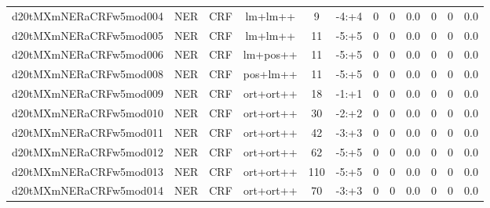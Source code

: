 \documentclass[a4paper]{article}
\begin{document}
\begin{landscape}
\begin{center}
\begin{tabular}{ |c|c|c|c|c|c|c|c|c|c|c|c|}
 
 	
 	\small{ d20tMXmNERaCRFw5mod004 } & \small{ NER} & \small{  CRF }  & lm+lm++  &  9 &  \small{  -4:+4 }  &  0 & 0 & 0.0  &  0 & 0 & 0.0 \\
 	

 
 	
 	\small{ d20tMXmNERaCRFw5mod005 } & \small{ NER} & \small{  CRF }  & lm+lm++  &  11 &  \small{  -5:+5 }  &  0 & 0 & 0.0  &  0 & 0 & 0.0 \\
 	

 
 	
 	\small{ d20tMXmNERaCRFw5mod006 } & \small{ NER} & \small{  CRF }  & lm+pos++  &  11 &  \small{  -5:+5 }  &  0 & 0 & 0.0  &  0 & 0 & 0.0 \\
 	

 
 	
 	\small{ d20tMXmNERaCRFw5mod008 } & \small{ NER} & \small{  CRF }  & pos+lm++  &  11 &  \small{  -5:+5 }  &  0 & 0 & 0.0  &  0 & 0 & 0.0 \\
 	

 
 	
 	\small{ d20tMXmNERaCRFw5mod009 } & \small{ NER} & \small{  CRF }  & ort+ort++  &  18 &  \small{  -1:+1 }  &  0 & 0 & 0.0  &  0 & 0 & 0.0 \\
 	

 
 	
 	\small{ d20tMXmNERaCRFw5mod010 } & \small{ NER} & \small{  CRF }  & ort+ort++  &  30 &  \small{  -2:+2 }  &  0 & 0 & 0.0  &  0 & 0 & 0.0 \\
 	

 
 	
 	\small{ d20tMXmNERaCRFw5mod011 } & \small{ NER} & \small{  CRF }  & ort+ort++  &  42 &  \small{  -3:+3 }  &  0 & 0 & 0.0  &  0 & 0 & 0.0 \\
 	

 
 	
 	\small{ d20tMXmNERaCRFw5mod012 } & \small{ NER} & \small{  CRF }  & ort+ort++  &  62 &  \small{  -5:+5 }  &  0 & 0 & 0.0  &  0 & 0 & 0.0 \\
 	

 
 	
 	\small{ d20tMXmNERaCRFw5mod013 } & \small{ NER} & \small{  CRF }  & ort+ort++  &  110 &  \small{  -5:+5 }  &  0 & 0 & 0.0  &  0 & 0 & 0.0 \\
 	

 
 	
 	\small{ d20tMXmNERaCRFw5mod014 } & \small{ NER} & \small{  CRF }  & ort+ort++  &  70 &  \small{  -3:+3 }  &  0 & 0 & 0.0  &  0 & 0 & 0.0 \\
 	


\end{tabular}
\end{center}
\end{landscape}
\end{document}
